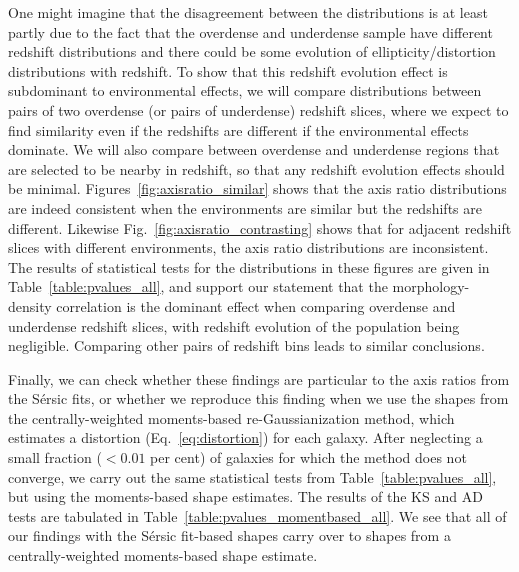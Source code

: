 \documentclass[twocolumn,useAMS,usenatbib]{mn2e}
\newcommand{\sersic}{S\'{e}rsic }
\begin{document}
One might imagine that the disagreement between the distributions is
at least partly due to the fact that the overdense and underdense
sample have different redshift distributions and there could be some
evolution of ellipticity/distortion distributions with redshift. 
To show that this redshift evolution effect is subdominant to
environmental effects, we will compare distributions between pairs of
two overdense (or pairs of underdense) redshift slices, where we
expect to find similarity even if the redshifts are different if the
environmental effects dominate.  We will also compare between
overdense and underdense regions that are selected to be nearby in
redshift, so that any redshift evolution effects should be minimal. 
Figures~\ref{fig:axisratio_similar}
shows that the axis ratio
distributions are indeed consistent when the environments are similar
but the redshifts are different.  Likewise
Fig.~\ref{fig:axisratio_contrasting} shows that for adjacent redshift
slices with different environments, the axis ratio distributions are
inconsistent.  The results of statistical tests for the distributions
in these figures are given in Table~\ref{table:pvalues_all}, and
support our statement that the morphology-density
correlation is the dominant effect when comparing overdense and
underdense redshift slices, with redshift evolution of the
population being negligible. 
Comparing other pairs of redshift
bins leads to similar conclusions. 

Finally, we can check whether these findings are particular to the
axis ratios from the \sersic fits, or whether we reproduce this
finding when we use the shapes from the centrally-weighted
moments-based re-Gaussianization method, which estimates a distortion
(Eq.~\ref{eq:distortion}) for each galaxy. 
After neglecting a small fraction ($<0.01$ per cent) of galaxies for
which the method does not converge, 
we carry out the same statistical tests from
Table~\ref{table:pvalues_all}, but using the moments-based shape
estimates.  The results of the KS and AD tests are tabulated in Table~\ref{table:pvalues_momentbased_all}.
We see that all of our findings with the \sersic fit-based shapes
carry over to shapes from a centrally-weighted moments-based shape
estimate.
\end{document}

